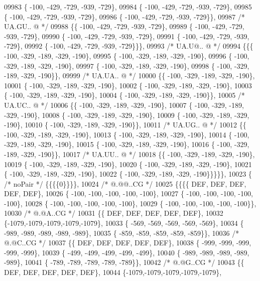 \begin{DoxyCode}
09983 \{ -100, -429, -729, -939, -729\},
09984 \{ -100, -429, -729, -939, -729\},
09985 \{ -100, -429, -729, -939, -729\},
09986 \{ -100, -429, -729, -939, -729\}\},
09987 \textcolor{comment}{/* UA.GU.. @ */}
09988 \{\{ -100, -429, -729, -939, -729\},
09989 \{ -100, -429, -729, -939, -729\},
09990 \{ -100, -429, -729, -939, -729\},
09991 \{ -100, -429, -729, -939, -729\},
09992 \{ -100, -429, -729, -939, -729\}\}\},
09993 \textcolor{comment}{/* UA.U@.. @ */}
09994 \{\{\{ -100, -329, -189, -329, -190\},
09995 \{ -100, -329, -189, -329, -190\},
09996 \{ -100, -329, -189, -329, -190\},
09997 \{ -100, -329, -189, -329, -190\},
09998 \{ -100, -329, -189, -329, -190\}\},
09999 \textcolor{comment}{/* UA.UA.. @ */}
10000 \{\{ -100, -329, -189, -329, -190\},
10001 \{ -100, -329, -189, -329, -190\},
10002 \{ -100, -329, -189, -329, -190\},
10003 \{ -100, -329, -189, -329, -190\},
10004 \{ -100, -329, -189, -329, -190\}\},
10005 \textcolor{comment}{/* UA.UC.. @ */}
10006 \{\{ -100, -329, -189, -329, -190\},
10007 \{ -100, -329, -189, -329, -190\},
10008 \{ -100, -329, -189, -329, -190\},
10009 \{ -100, -329, -189, -329, -190\},
10010 \{ -100, -329, -189, -329, -190\}\},
10011 \textcolor{comment}{/* UA.UG.. @ */}
10012 \{\{ -100, -329, -189, -329, -190\},
10013 \{ -100, -329, -189, -329, -190\},
10014 \{ -100, -329, -189, -329, -190\},
10015 \{ -100, -329, -189, -329, -190\},
10016 \{ -100, -329, -189, -329, -190\}\},
10017 \textcolor{comment}{/* UA.UU.. @ */}
10018 \{\{ -100, -329, -189, -329, -190\},
10019 \{ -100, -329, -189, -329, -190\},
10020 \{ -100, -329, -189, -329, -190\},
10021 \{ -100, -329, -189, -329, -190\},
10022 \{ -100, -329, -189, -329, -190\}\}\}\}\},
10023 \{ \textcolor{comment}{/* noPair */} \{\{\{\{0\}\}\}\},
10024 \textcolor{comment}{/*  @.@@..CG */}
10025 \{\{\{\{  DEF,  DEF,  DEF,  DEF,  DEF\},
10026 \{ -100, -100, -100, -100, -100\},
10027 \{ -100, -100, -100, -100, -100\},
10028 \{ -100, -100, -100, -100, -100\},
10029 \{ -100, -100, -100, -100, -100\}\},
10030 \textcolor{comment}{/*  @.@A..CG */}
10031 \{\{  DEF,  DEF,  DEF,  DEF,  DEF\},
10032 \{-1079,-1079,-1079,-1079,-1079\},
10033 \{ -569, -569, -569, -569, -569\},
10034 \{ -989, -989, -989, -989, -989\},
10035 \{ -859, -859, -859, -859, -859\}\},
10036 \textcolor{comment}{/*  @.@C..CG */}
10037 \{\{  DEF,  DEF,  DEF,  DEF,  DEF\},
10038 \{ -999, -999, -999, -999, -999\},
10039 \{ -499, -499, -499, -499, -499\},
10040 \{ -989, -989, -989, -989, -989\},
10041 \{ -789, -789, -789, -789, -789\}\},
10042 \textcolor{comment}{/*  @.@G..CG */}
10043 \{\{  DEF,  DEF,  DEF,  DEF,  DEF\},
10044 \{-1079,-1079,-1079,-1079,-1079\},

\end{DoxyCode}

